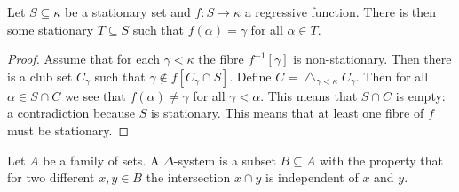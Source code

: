 \begin{theorem}
    Let \(S\subseteq\kappa\) be a stationary set and \(f:S\to\kappa\) a
    regressive function. There is then some stationary \(T\subseteq S\) such
    that \(f(\alpha)=\gamma\) for all \(\alpha\in T\).

    \begin{proof}
        Assume that for each \(\gamma<\kappa\) the fibre \(f^{-1}[\gamma]\) is
        non-stationary. Then there is a club set \(C_{\gamma}\) such that
        \(\gamma\notin f[C_{\gamma}\cap S]\). Define
        \(C=\bigtriangleup_{\gamma<\kappa}C_{\gamma}\). Then for all \(\alpha\in
        S\cap C\) we see that \(f(\alpha)\neq\gamma\) for all \(\gamma<\alpha\).
        This means that \(S\cap C\) is empty: a contradiction because \(S\) is
        stationary. This means that at least one fibre of \(f\) must be
        stationary.
    \end{proof}
\end{theorem}

\begin{definition}
    Let \(A\) be a family of sets. A \(\Delta\)-system is a subset \(B\subseteq
    A\) with the property that for two different \(x,y\in B\) the intersection
    \(x\cap y\) is independent of \(x\) and \(y\).
\end{definition}

